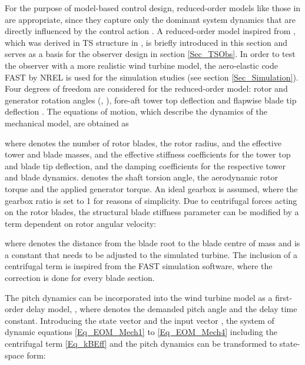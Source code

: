 \documentclass[a4paper]{article}
\begin{document}
For the purpose of model-based control design, reduced-order models like those in \cite{Bindner:1999, Bianchi:2007} are appropriate, since they capture only the dominant system dynamics that are directly influenced by the control action \cite{Bianchi:2007}. A reduced-order model inspired from \cite{Bianchi:2007}, which was derived in TS structure in \cite{Georg:Fuzz2012}, is briefly introduced in this section and serves as a basis for the observer design in section \ref{Sec_TSObs}. In order to test the observer with a more realistic wind turbine model, the aero-elastic code FAST by NREL \cite{FASTUserGuide} is used for the simulation studies (see section \ref{Sec_Simulation}).
\newline Four degrees of freedom are considered for the reduced-order model: rotor and generator rotation angles (, ), fore-aft tower top deflection  and flapwise blade tip deflection . The equations of motion, which describe the dynamics of the mechanical model, are obtained as




\newline where  denotes the number of rotor blades,  the rotor radius,  and  the effective tower and blade masses,  and  the effective stiffness coefficients for the tower top and blade tip deflection,  and  the damping coefficients for the respective tower and blade dynamics.  denotes the shaft torsion angle,  the aerodynamic rotor torque and  the applied generator torque. An ideal gearbox is assumed, where the gearbox ratio is set to 1 for reasons of simplicity.
\newline Due to centrifugal forces acting on the rotor blades, the structural blade stiffness parameter can be modified by a term dependent on rotor angular velocity:


\newline where  denotes the distance from the blade root to the blade centre of mass and  is a constant that needs to be adjusted to the simulated turbine. The inclusion of a centrifugal term is inspired from the FAST simulation software, where the correction is done for every blade section.

The pitch dynamics can be incorporated into the wind turbine model as a first-order delay model, , where  denotes the demanded pitch angle and  the delay time constant.
\newline Introducing the state vector
 and the input vector
 , the system of dynamic
equations \eqref{Eq_EOM_Mech1} to \eqref{Eq_EOM_Mech4} including the centrifugal term \eqref{Eq_kBEff}
and the pitch dynamics can be transformed to state-space form:
\end{document}
